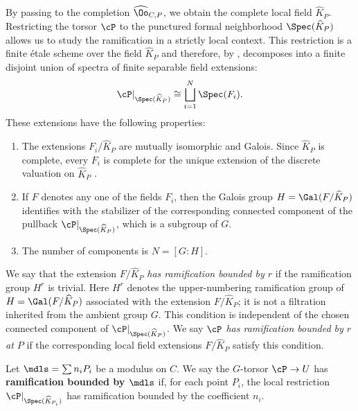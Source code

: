 By passing to the completion $\widehat{\Oo}_{C,P}$, we obtain the complete local field $\widehat{K}_P$.
Restricting the torsor $\cP$ to the punctured formal neighborhood $\Spec(\widehat{K}_P)$
allows us to study the ramification in a strictly local context.
This restriction is a finite \'etale scheme over the field $\widehat{K}_P$ and therefore, by
, decomposes into a finite disjoint union of spectra of finite separable field extensions:
\[
    \cP|_{\Spec(\widehat{K}_P)} \cong \bigsqcup_{i=1}^N \Spec(F_i).
\]
These extensions have the following properties:
\begin{enumerate}
    \item The extensions $F_i/\widehat{K}_P$ are mutually isomorphic and Galois. Since
    $\widehat{K}_P$ is complete, every $F_i$ is complete for the unique extension of the discrete valuation on
    $\widehat{K}_P$ \cite[Chapter~II, \S 2, Proposition~3]{serreLF}.
    \item If $F$ denotes any one of the fields $F_i$, then the Galois group
    $H = \Gal(F/\widehat{K}_P)$ identifies with the stabilizer of the corresponding connected component of the pullback $\cP|_{\Spec(\widehat{K}_P)}$,
     which is a subgroup of $G$.
    \item The number of components is $N=[G:H]$.
\end{enumerate}

\begin{definition}\label{definition:local_ramification_boundness}
    We say that the extension $F/\widehat{K}_P$ \textit{has ramification bounded by $r$} if the ramification group $H^r$ is trivial.
    Here $H^r$ denotes the upper-numbering ramification group of
    $H=\Gal(F/\widehat{K}_P)$ associated with the extension $F/\widehat{K}_P$; it is not a filtration inherited from the ambient group $G$.
    This condition is independent of the chosen connected component of
    $\cP|_{\Spec(\widehat{K}_P)}$.
    We say \textit{$\cP$ has ramification bounded by $r$ at $P$} if the corresponding local field extensions $F/\widehat{K}_P$
    satisfy this condition.
\end{definition}


\begin{definition}\label{definition:ramification_bounded_by_modulus_closed_points}
    Let $\mdls = \sum n_i P_i$ be a modulus on $C$. We say the $G$-torsor $\cP \to U$ has
    \textbf{ramification bounded by $\mdls$} if, for each point $P_i$, the local restriction
    $\cP|_{\Spec(\widehat{K}_{P_i})}$ has ramification bounded by the coefficient $n_i$.
\end{definition}

